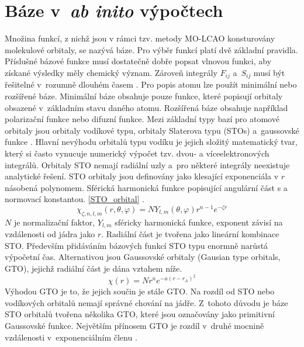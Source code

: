\documentclass[
  printed, %
  table,   %
  lof,     %
  lot,     %
  oneside,
]{fithesis3}
\begin{document}
\section{Báze v~\textit{ab inito} výpočtech }\label{kapitola_baze}
Množina funkcí, z nichž jsou v rámci tzv. metody MO-LCAO konsturovány molekulové orbitaly, se nazývá báze. Pro výběr funkcí platí dvě základní pravidla. Příslušné bázové funkce musí dostatečně dobře popsat vlnovou funkci, aby získané výsledky měly chemický význam. Zároveň integrály $F_{ij}$ a~$S_{ij}$ musí být řešitelné v~rozumně dlouhém časem \cite{lowe2011quantum}.
Pro popis atomu lze použít minimální nebo rozšířené báze. Minimální báze obsahuje pouze funkce, které popisují orbitaly obsazené v~základním stavu daného atomu. Rozšířená báze obsahuje například polarizační funkce nebo difuzní funkce. Mezi základní typy bazí pro atomové orbitaly jsou orbitaly vodíkové typu, orbitaly Slaterova typu (STOs) a~gaussovské funkce \cite{dftshrnutivysledky}.
Hlavní nevýhodu orbitalů typu vodíku je jejich složitý matematický tvar, který si často vynucuje numerický výpočet tzv. dvou- a víceelektronových integrálů. Orbitaly STO nemají radiální uzly a~pro některé integrály neexistuje analytické řešení. STO orbitaly jsou definovány jako klesající exponenciála v $r$ násobená polynomem. Sférická harmonická funkce popisující angulární část s a normovací konstantou. \ref{STO_orbital} \cite{jensen2007introduction}.
\begin{equation}
\chi_{\zeta, n, l, m}(r, \theta, \varphi) = NY_{l,m} (\theta, \varphi) r^{n-1} e^{-\zeta r}
\label{STO_orbital} 
\end{equation}
$N$ je normalizační faktor, $Y_{l,m}$ sféricky harmonická funkce, exponent závisí na vzdálenosti od jádra jako $r$. Radiální část je tvořena jako lineární kombinace STO. Především přidáváním bázových funkcí STO typu enormně narůstá výpočetní čas. Alternativou jsou Gaussovské orbitaly (Gausian type orbitals, GTO), jejichž radiální část je dána vztahem níže.
\begin{equation}
\chi(r) = Nr^n e^{-a(r-r_A)^2}
\end{equation}
 Výhodou GTO je to, že jejich součin je stále GTO. Na rozdíl od STO nebo vodíkových orbitalů nemají správné chování na jádře. Z~tohoto důvodu je báze STO orbitalů tvořena několika GTO, které jsou označovány jako primitivní Gaussovské funkce. Největším přínosem GTO je rozdíl v~druhé mocnině vzdálenosti v~exponenciálním členu \cite{lowe2011quantum}. 
\end{document}
